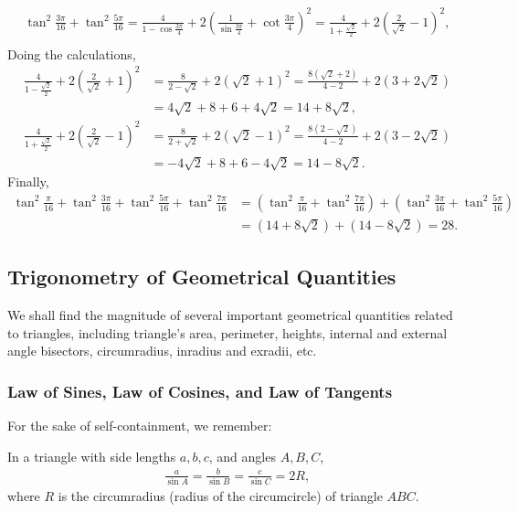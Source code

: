 \begin{solution}[name=Solution by Amir Parvardi]
\begin{align*}
        \tan^2 \frac{3\pi}{16} + \tan^2 \frac{5\pi}{16} = \frac{4}{1 - \cos \frac{3\pi}{4}} + 2 \left(\frac{1}{\sin \frac{3\pi}{4}} + \cot \frac{3\pi}{4}\right)^2 = \frac{4}{1 + \frac{\sqrt 2}{2}} + 2 \left(\frac{2}{\sqrt 2} - 1\right)^2,\\
    \end{align*}
Doing the calculations,
\begin{align*}
    \frac{4}{1 - \frac{\sqrt 2}{2}} + 2 \left(\frac{2}{\sqrt 2} + 1\right)^2 &= \frac{8}{2 - \sqrt 2} + 2(\sqrt 2 + 1)^2 = \frac{8(\sqrt 2+ 2)}{4 - 2} + 2(3 + 2\sqrt 2)\\
    &= 4\sqrt 2 + 8 + 6 + 4 \sqrt 2 = 14 + 8\sqrt 2,\\
    \frac{4}{1 + \frac{\sqrt 2}{2}} + 2 \left(\frac{2}{\sqrt 2} - 1\right)^2 &= \frac{8}{2 + \sqrt 2} + 2(\sqrt 2 - 1)^2 = \frac{8(2 - \sqrt 2)}{4 - 2} + 2(3 - 2\sqrt 2)\\
    &= -4\sqrt 2 + 8 + 6 - 4 \sqrt 2 = 14 - 8\sqrt 2.
\end{align*}
Finally,
\begin{align*}
     \tan^2\frac{\pi}{16}+ \tan^2\frac{3\pi}{16}+\tan^2\frac{5\pi}{16} + \tan^2\frac{7\pi}{16} &= \left(\tan^2\frac{\pi}{16}+\tan^2\frac{7\pi}{16}\right) + \left(\tan^2\frac{3\pi}{16} + \tan^2\frac{5\pi}{16}\right)\\
     &= (14 + 8 \sqrt 2) + (14 - 8 \sqrt 2) = 28.
\end{align*}
\end{solution}


\newpage
\subsection{Trigonometry of Geometrical Quantities}

We shall find the magnitude of several important geometrical quantities related to triangles, including triangle's area, perimeter, heights, internal and external angle bisectors, circumradius, inradius and exradii, etc.

\subsubsection{Law of Sines, Law of Cosines, and Law of Tangents}
For the sake of self-containment, we remember:
\begin{tcolorbox}
    \begin{question}[name=Law of Sines]
    In a triangle with side lengths $a,b,c$, and angles $A,B,C$,
    \begin{align*}
        \frac{a}{\sin A} = \frac{b}{\sin B} = \frac{c}{\sin C} = 2R,
    \end{align*}
    where $R$ is the circumradius (radius of the circumcircle) of triangle $ABC$.
\end{question}
\end{tcolorbox}


